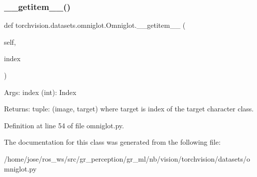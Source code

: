 \subsubsection{\texorpdfstring{\+\_\+\+\_\+getitem\+\_\+\+\_\+()}{\_\_getitem\_\_()}}
{\footnotesize\ttfamily def torchvision.\+datasets.\+omniglot.\+Omniglot.\+\_\+\+\_\+getitem\+\_\+\+\_\+ (\begin{DoxyParamCaption}\item[{}]{self,  }\item[{}]{index }\end{DoxyParamCaption})}

\begin{DoxyVerb}Args:
    index (int): Index

Returns:
    tuple: (image, target) where target is index of the target character class.
\end{DoxyVerb}
 

Definition at line 54 of file omniglot.\+py.



The documentation for this class was generated from the following file\+:\begin{DoxyCompactItemize}
\item 
/home/jose/ros\+\_\+ws/src/gr\+\_\+perception/gr\+\_\+ml/nb/vision/torchvision/datasets/omniglot.\+py\end{DoxyCompactItemize}
